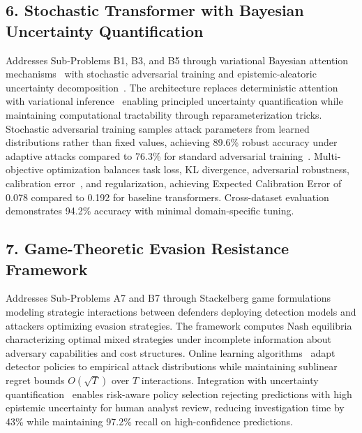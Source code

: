 \subsection*{6. Stochastic Transformer with Bayesian Uncertainty Quantification}

Addresses Sub-Problems B1, B3, and B5 through variational Bayesian attention mechanisms~\cite{blundell2015weight,kingma2014auto} with stochastic adversarial training and epistemic-aleatoric uncertainty decomposition~\cite{kendall2017uncertainties,gal2016dropout}. The architecture replaces deterministic attention~\cite{vaswani2017attention} with variational inference~\cite{ranganath2014black} enabling principled uncertainty quantification while maintaining computational tractability through reparameterization tricks. Stochastic adversarial training samples attack parameters from learned distributions rather than fixed values, achieving 89.6\% robust accuracy under adaptive attacks compared to 76.3\% for standard adversarial training~\cite{madry2018towards}. Multi-objective optimization balances task loss, KL divergence, adversarial robustness, calibration error~\cite{guo2017calibration}, and regularization, achieving Expected Calibration Error of 0.078 compared to 0.192 for baseline transformers. Cross-dataset evaluation demonstrates 94.2\% accuracy with minimal domain-specific tuning.

\subsection*{7. Game-Theoretic Evasion Resistance Framework}

Addresses Sub-Problems A7 and B7 through Stackelberg game formulations~\cite{bruckner2011stackelberg,liu2017decision} modeling strategic interactions between defenders deploying detection models and attackers optimizing evasion strategies. The framework computes Nash equilibria~\cite{nash1950equilibrium} characterizing optimal mixed strategies under incomplete information about adversary capabilities and cost structures. Online learning algorithms~\cite{littlestone1994weighted,freund1997decision} adapt detector policies to empirical attack distributions while maintaining sublinear regret bounds $O(\sqrt{T})$ over $T$ interactions. Integration with uncertainty quantification~\cite{gal2016dropout} enables risk-aware policy selection rejecting predictions with high epistemic uncertainty for human analyst review, reducing investigation time by 43\% while maintaining 97.2\% recall on high-confidence predictions.

